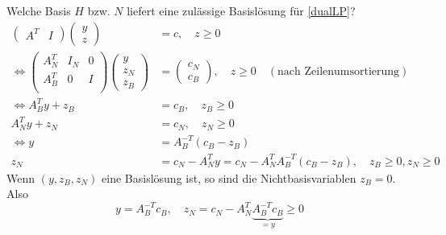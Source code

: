 Welche Basis $H$ bzw. $N$ liefert eine zulässige Basislösung für \eqref{dualLP}?
\begin{align*}
  \begin{pmatrix}
    A^{T}  & I
  \end{pmatrix}
  \begin{pmatrix}
    y\\z
  \end{pmatrix}
  &=c, \quad z \geq 0\\
  \iff \begin{pmatrix}
      A_N^T & I_N & 0 \\
      A_B^T & 0 & I \\
    \end{pmatrix}
    \begin{pmatrix}
      y \\ z_N \\ z_B
    \end{pmatrix}
    &= \begin{pmatrix}
    c_N \\ c_B
  \end{pmatrix}
  , \quad z \geq 0 \quad (\text{nach Zeilenumsortierung})\\
  \iff A_{B}^{T} y + z_{B} &= c_{B}, \quad z_{B} \geq 0\\
    A_{N}^{T} y + z_{N} &= c_{N}, \quad z_{N} \geq 0 \\
    \iff y &= A_{B}^{-T}(c_{B}-z_{B})\\
      z_{N}&= c_{N} - A_{N}^{T}y = c_{N}-A_{N}^{T} A_{B}^{-T}(c_{B}-z_{B}) ,\quad z_{B}\geq 0, z_{N} \geq 0
\end{align*}
Wenn $(y,z_{B},z_{N})$ eine Basislösung ist, so sind die Nichtbasisvariablen $z_{B} =0$.
Also
\begin{equation*}
	y = A_{B}^{-T}c_{B}, \quad z_{N}= c_{N}- A_{N}^{T} \underbrace{A_{B}^{-T}c_{B}}_{{=y}}\geq 0
\end{equation*}
